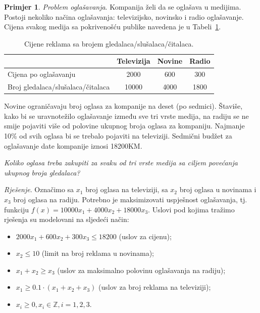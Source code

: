 \documentclass[b5paper, utf8, 11pt, colorlinks]{book}
\theoremstyle{definition}
\newtheorem{primjer}{Primjer}[chapter]
\begin{document}
\begin{primjer}
	\emph{Problem oglašavanja}. Kompanija želi da se oglašava u medijima. Postoji nekoliko načina oglašavanja:  televizijsko, novinsko i radio oglašavanje. Cijena svakog medija sa pokrivenošću publike navedena je u Tabeli~\ref{tab:tab_model_advertising}.
	
	\begin{table}[!ht]
		\centering
		\begin{tabular}{l|c|c|c} \hline
			\                  & Televizija & Novine & Radio  \\ \hline
			Cijena po oglašavanju      & 2000       & 600    & 300    \\
			Broj gledalaca/slušalaca/čitalaca      & 10000      & 4000  & 1800 \\ \hline
		\end{tabular}
		\caption{Cijene reklama sa brojem gledalaca/slušalaca/čitalaca.}
		\label{tab:tab_model_advertising}
	\end{table}
	
	
	Novine ograničavaju broj oglasa za kompanije na deset (po sedmici). Štaviše, kako bi se uravnotežilo oglašavanje između sve tri vrste medija, na radiju se ne smije pojaviti više od polovine ukupnog broja oglasa za kompaniju. Najmanje 10\% od svih oglasa bi se trebalo pojaviti na televiziji. Sedmični budžet za oglašavanje date kompanije iznosi 18200KM. 
	
	\emph{Koliko oglasa treba zakupiti za svaku od tri vrste medija sa ciljem povećanja ukupnog broja gledalaca?}
	
	\emph{Rješenje}.   Označimo sa $x_1$ broj oglasa na televiziji, sa $x_2$ broj oglasa u novinama i $x_3$ broj oglasa na radiju. Potrebno je maksimizovati   uspješnost oglašavanja, tj. funkciju 
	$f(x) = 10000 x_1 + 4000 x_2 + 18000 x_3.$ Uslovi pod kojima tražimo rješenja su modelovani na sljedeći način:
	\begin{itemize}
		\item $2000 x_1 + 600 x_2 + 300 x_3 \leq 18200$ (uslov za cijenu);
		\item  $ x_2 \leq 10$ (limit na broj reklama u novinama);
		\item $x_1 + x_2 \geq x_3$ (uslov za maksimalno polovinu oglašavanja na radiju);
		\item ${x_1}\geq 0.1\cdot (x_1 + x_2 + x_3)$ (uslov za broj reklama na televiziji);
		\item $x_i \geq 0, x_i \in \mathbb{Z}, i=1,2,3$.
	\end{itemize}
	
\end{primjer}
\end{document}
